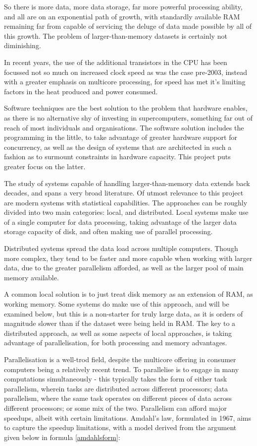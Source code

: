 So there is more data, more data storage, far more powerful processing ability, and all are on an exponential path of growth, with standardly available RAM remaining far from capable of servicing the deluge of data made possible by all of this growth\cite{sutter2005free}.
The problem of larger-than-memory datasets is certainly not diminishing.

In recent years, the use of the additional transistors in the CPU has been focussed not so much on increased clock speed as was the case pre-2003, instead with a greater emphasis on multicore processing, for speed has met it's limiting factors in the heat produced and power consumed\cite{sutter2005free}.

Software techniques are the best solution to the problem that hardware enables, as there is no alternative shy of investing in supercomputers, something far out of reach of most individuals and organisations.
The software solution includes the programming in the little, to take advantage of greater hardware support for concurrency, as well as the design of systems that are architected in such a fashion as to surmount constraints in hardware capacity.
This project puts greater focus on the latter.

The study of systems capable of handling larger-than-memory data extends back decades, and spans a very broad literature.
Of utmost relevance to this project are modern systems with statistical capabilities.
The approaches can be roughly divided into two main categories: local, and distributed.
Local systems make use of a single computer for data processing, taking advantage of the larger data storage capacity of disk, and often making use of parallel processing.

Distributed systems spread the data load across multiple computers.
Though more complex, they tend to be faster and more capable when working with larger data, due to the greater parallelism afforded, as well as the larger pool of main memory available.

A common local solution is to just treat disk memory as an extension of RAM, as working memory.
Some systems do make use of this approach, and will be examined below, but this is a non-starter for truly large data, as it is orders of magnitude slower than if the dataset were being held in RAM.
The key to a distributed approach, as well as some aspects of local approaches, is taking advantage of parallelisation, for both processing and memory advantages.

Parallelisation is a well-trod field, despite the multicore offering in consumer computers being a relatively recent trend.
To parallelise is to engage in many computations simultaneously - this typically takes the form of either task parallelism, wherein tasks are distributed across different processors; data parallelism, where the same task operates on different pieces of data across different processors; or some mix of the two.
Parallelism can afford major speedups, albeit with certain limitations.
Amdahl's law, formulated in 1967, aims to capture the speedup limitations, with a model derived from the argument given below in formula \ref{amdahlsform}\cite{amdahl1967law}\cite{gustafson1988law}:

